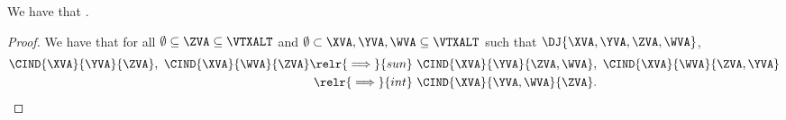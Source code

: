 \begin{proposition}
  We have that \inddecomprevdef.%
\end{proposition}

\begin{proof}
  We have that for all $\emptyset \subseteq \ZVA \subseteq \VTXALT$ and $\emptyset \subset \XVA, \YVA, \WVA \subseteq \VTXALT$ such that $\DJ{\XVA, \YVA, \ZVA, \WVA}$,
  \begin{align*}
    \CIND{\XVA}{\YVA}{\ZVA},\ 
    \CIND{\XVA}{\WVA}{\ZVA} 
    \relr {\implies} {sun} &\ 
    \CIND{\XVA}{\YVA}{\ZVA, \WVA},\ 
    \CIND{\XVA}{\WVA}{\ZVA, \YVA}\\
    \relr {\implies} {int} &\ 
    \CIND{\XVA}{\YVA,\WVA}{\ZVA}.
  \end{align*}
\end{proof}

